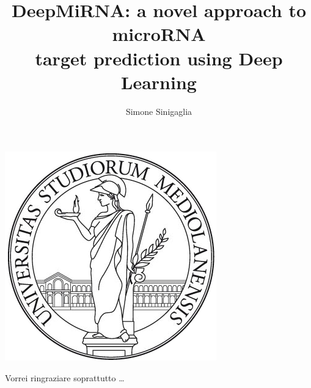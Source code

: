 \documentclass[
12pt, %
english, %
]{report} %
\begin{document}
	
	\title{DeepMiRNA: a novel approach to microRNA \\ 
		target prediction using Deep Learning}
	\author{Simone Sinigaglia}
	
	\begin{center}
		\includegraphics{Figures/logo_unimi}\\[1cm]
	\end{center}
	
	\beforepreface
	Vorrei ringraziare soprattutto \dots
	\afterpreface
	
	
	
%
%

	
	
	
%
%
	
	\appendix %
	

%

	
	

\end{document}
